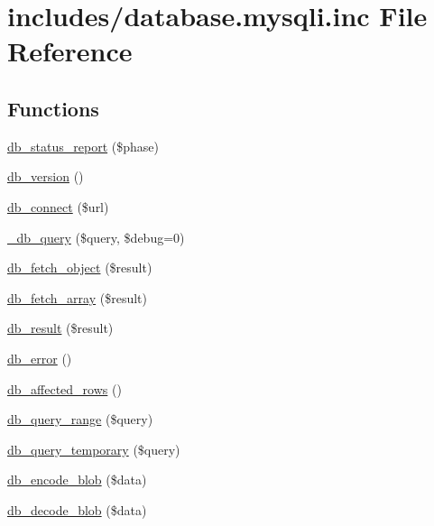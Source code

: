 \hypertarget{database_8mysqli_8inc}{
\section{includes/database.mysqli.inc File Reference}
\label{database_8mysqli_8inc}
}
\subsection*{Functions}
\begin{Indent}{\bf }\par
\begin{CompactItemize}
\item 
\hyperlink{database_8mysqli_8inc_497d9afd8edb209108db34ea159c77ca}{db\_\-status\_\-report} (\$phase)
\item 
\hyperlink{database_8mysqli_8inc_6736a6897048ff0167a0bbe5e374fc13}{db\_\-version} ()
\item 
\hyperlink{database_8mysqli_8inc_bc9960ee403664deae1c219015dc5ff2}{db\_\-connect} (\$url)
\item 
\hyperlink{database_8mysqli_8inc_f0a663e6a6aaf095f78a77c871b8028b}{\_\-db\_\-query} (\$query, \$debug=0)
\item 
\hyperlink{database_8mysqli_8inc_5faaeba7105d28828db453b4fd3c75d4}{db\_\-fetch\_\-object} (\$result)
\item 
\hyperlink{database_8mysqli_8inc_2bd5f98fec7f21ee2c37f6b83785dcb9}{db\_\-fetch\_\-array} (\$result)
\item 
\hyperlink{database_8mysqli_8inc_953354ea01b236440b187210dc18aad9}{db\_\-result} (\$result)
\item 
\hyperlink{database_8mysqli_8inc_5acae04a62f1baa2e83d189e72071bfe}{db\_\-error} ()
\item 
\hyperlink{database_8mysqli_8inc_e3bc677fbeebd688068ce3b413ac2944}{db\_\-affected\_\-rows} ()
\item 
\hyperlink{database_8mysqli_8inc_893cbcab2ecf321005eae4e278adc22b}{db\_\-query\_\-range} (\$query)
\item 
\hyperlink{database_8mysqli_8inc_bce8dcddcded20016a1925824cd09efa}{db\_\-query\_\-temporary} (\$query)
\item 
\hyperlink{database_8mysqli_8inc_464ab7b26ecfdddc68f3564ca609ac3f}{db\_\-encode\_\-blob} (\$data)
\item 
\hyperlink{database_8mysqli_8inc_1ed4215d202290ca055de8f6cf3b6f08}{db\_\-decode\_\-blob} (\$data)
\item 

\end{CompactItemize}
\end{Indent}
